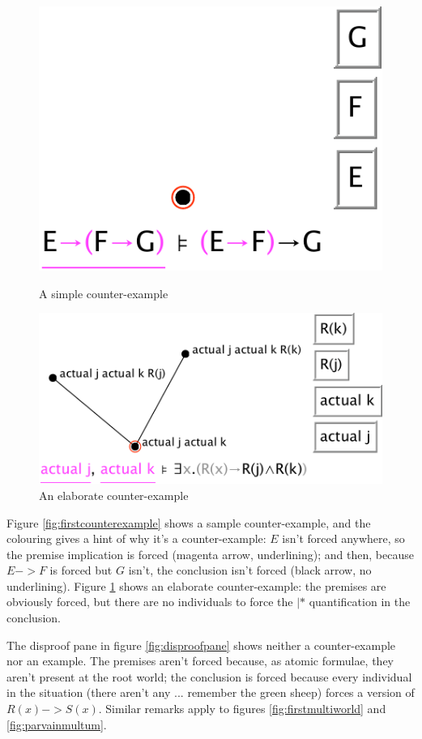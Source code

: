 \documentclass[11pt]{book}
\newcommand{\figref}[1]{figure \ref{fig:#1}}
\newcommand{\Figref}[1]{Figure \ref{fig:#1}}
\begin{document}
\begin{figure}
\centering
\parbox{150pt}{\centering
\includegraphics[scale=0.5]{pics/firstcounterexample}
\caption{A simple counter-example}
\label{fig:firstcounterexample}
}
\qquad
\parbox{250pt}{\centering
\includegraphics[scale=0.5]{pics/elaboratecounterexample}
\caption{An elaborate counter-example}
\label{fig:elaboratecounterexample}
}
\end{figure}

\Figref{firstcounterexample} shows a sample counter-example, and the colouring gives a hint of why it's a counter-example: $E$ isn't forced anywhere, so the premise implication is forced (magenta arrow, underlining); and then, because $E->F$ is forced but $G$ isn't, the conclusion isn't forced (black arrow, no underlining). \Figref{elaboratecounterexample} shows an elaborate counter-example: the premises are obviously forced, but there are no individuals to force the $|*$ quantification in the conclusion.

The disproof pane in \figref{disproofpane} shows neither a counter-example nor an example. The premises aren't forced because, as atomic formulae, they aren't present at the root world; the conclusion is forced because every individual in the situation (there aren't any ... remember the green sheep) forces a version of $R(x)->S(x)$. Similar remarks apply to figures \ref{fig:firstmultiworld} and \ref{fig:parvainmultum}.
\end{document}
